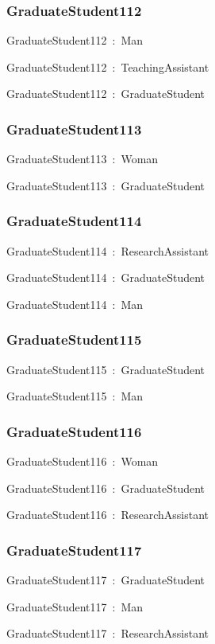 \documentclass{article}
\begin{document}
\subsubsection*{GraduateStudent112}

GraduateStudent112~:~Man

GraduateStudent112~:~TeachingAssistant

GraduateStudent112~:~GraduateStudent

\subsubsection*{GraduateStudent113}

GraduateStudent113~:~Woman

GraduateStudent113~:~GraduateStudent

\subsubsection*{GraduateStudent114}

GraduateStudent114~:~ResearchAssistant

GraduateStudent114~:~GraduateStudent

GraduateStudent114~:~Man

\subsubsection*{GraduateStudent115}

GraduateStudent115~:~GraduateStudent

GraduateStudent115~:~Man

\subsubsection*{GraduateStudent116}

GraduateStudent116~:~Woman

GraduateStudent116~:~GraduateStudent

GraduateStudent116~:~ResearchAssistant

\subsubsection*{GraduateStudent117}

GraduateStudent117~:~GraduateStudent

GraduateStudent117~:~Man

GraduateStudent117~:~ResearchAssistant
\end{document}
